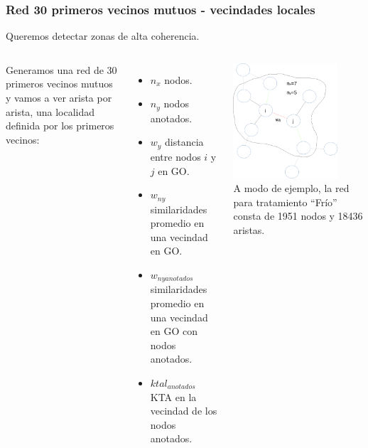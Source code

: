 \documentclass[serif,9pt, t]{beamer}
\newcommand\Fontvi{\fontsize{7}{7.2}\selectfont}
\begin{document}
\begin{frame}\frametitle{Red 30 primeros vecinos mutuos - vecindades locales} 
\centering
Queremos detectar zonas de alta coherencia.\\
\bigskip
\begin{columns}[T]
	 Generamos una red de 30 primeros vecinos mutuos y vamos a ver arista por arista, una localidad definida por los primeros vecinos:\\
	\begin{itemize}
	\item $n_x$ nodos.
	\item $n_y$ nodos anotados.
	\item $w_y$ distancia entre nodos $i$ y $j$ en GO.
	\item $w_{ny}$ similaridades promedio en una vecindad en GO.
	\item $w_{ny anotados}$ similaridades promedio en una vecindad en GO con nodos anotados.	
	\item $ktal_{anotados}$ KTA en la vecindad de los nodos anotados.		
	\end{itemize}
    \centering
    \bigskip
    \includegraphics[width=0.8\textwidth]{vecindario_local.pdf}\\
    \bigskip
    \Fontvi
	A modo de ejemplo, la red para tratamiento ``Frío'' consta de 1951 nodos y 18436 aristas.
\end{columns}
\end{frame}
\end{document}

